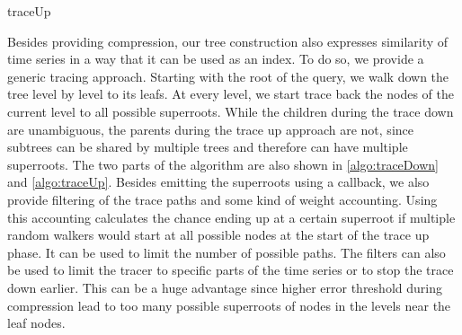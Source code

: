 \begin{algorithm}



    \caption{traceUp}\label{algo:traceUp}
\end{algorithm}

Besides providing compression, our tree construction also expresses similarity of time series in a way that it can be used as an index. To do so, we provide a generic tracing approach. Starting with the root of the query, we walk down the tree level by level to its leafs. At every level, we start trace back the nodes of the current level to all possible superroots. While the children during the trace down are unambiguous, the parents during the trace up approach are not, since subtrees can be shared by multiple trees and therefore can have multiple superroots. The two parts of the algorithm are also shown in \autoref{algo:traceDown} and \autoref{algo:traceUp}. Besides emitting the superroots using a callback, we also provide filtering of the trace paths and some kind of weight accounting. Using this accounting calculates the chance ending up at a certain superroot if multiple random walkers would start at all possible nodes at the start of the trace up phase. It can be used to limit the number of possible paths. The filters can also be used to limit the tracer to specific parts of the time series or to stop the trace down earlier. This can be a huge advantage since higher error threshold during compression lead to too many possible superroots of nodes in the levels near the leaf nodes.

